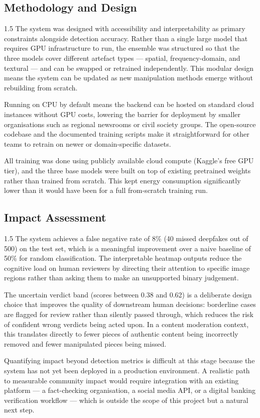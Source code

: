 \subsection{Methodology and Design}

\begin{spacing}{1.5}
The system was designed with accessibility and interpretability as primary constraints alongside detection accuracy. Rather than a single large model that requires GPU infrastructure to run, the ensemble was structured so that the three models cover different artefact types --- spatial, frequency-domain, and textural --- and can be swapped or retrained independently. This modular design means the system can be updated as new manipulation methods emerge without rebuilding from scratch.

Running on CPU by default means the backend can be hosted on standard cloud instances without GPU costs, lowering the barrier for deployment by smaller organisations such as regional newsrooms or civil society groups. The open-source codebase and the documented training scripts make it straightforward for other teams to retrain on newer or domain-specific datasets.

All training was done using publicly available cloud compute (Kaggle's free GPU tier), and the three base models were built on top of existing pretrained weights rather than trained from scratch. This kept energy consumption significantly lower than it would have been for a full from-scratch training run.
\end{spacing}

\subsection{Impact Assessment}

\begin{spacing}{1.5}
The system achieves a false negative rate of 8\% (40 missed deepfakes out of 500) on the test set, which is a meaningful improvement over a naive baseline of 50\% for random classification. The interpretable heatmap outputs reduce the cognitive load on human reviewers by directing their attention to specific image regions rather than asking them to make an unsupported binary judgement.

The uncertain verdict band (scores between 0.38 and 0.62) is a deliberate design choice that improves the quality of downstream human decisions: borderline cases are flagged for review rather than silently passed through, which reduces the risk of confident wrong verdicts being acted upon. In a content moderation context, this translates directly to fewer pieces of authentic content being incorrectly removed and fewer manipulated pieces being missed.

Quantifying impact beyond detection metrics is difficult at this stage because the system has not yet been deployed in a production environment. A realistic path to measurable community impact would require integration with an existing platform --- a fact-checking organisation, a social media API, or a digital banking verification workflow --- which is outside the scope of this project but a natural next step.
\end{spacing}

